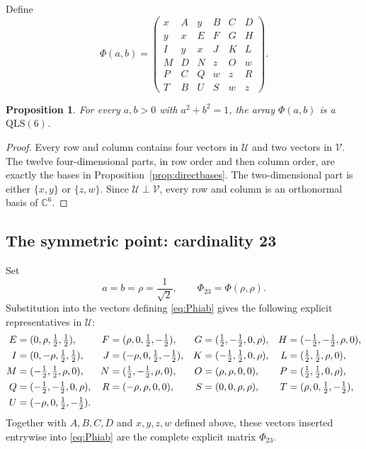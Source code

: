 \documentclass[11pt,a4paper]{article}
\newcommand{\C}{\mathbb{C}}
\newcommand{\QLS}{\mathrm{QLS}}
\newtheorem{proposition}{Proposition}
\begin{document}
Define
\begin{equation}\label{eq:Phiab}
 \Phi(a,b)=
 \begin{pmatrix}
 x&A&y&B&C&D\\
 y&x&E&F&G&H\\
 I&y&x&J&K&L\\
 M&D&N&z&O&w\\
 P&C&Q&w&z&R\\
 T&B&U&S&w&z
 \end{pmatrix}.
\end{equation}

\begin{proposition}\label{prop:PhiabQLS}
For every $a,b>0$ with $a^2+b^2=1$, the array $\Phi(a,b)$ is a $\QLS(6)$.
\end{proposition}

\begin{proof}
Every row and column contains four vectors in $\mathcal U$ and two vectors in
$\mathcal V$.  The twelve four-dimensional parts, in row order and then
column order, are exactly the bases in Proposition~\ref{prop:directbases}.
The two-dimensional part is either $\{x,y\}$ or $\{z,w\}$.  Since
$\mathcal U\perp\mathcal V$, every row and column is an orthonormal basis of
$\C^6$.
\end{proof}

\subsection{The symmetric point: cardinality 23}

Set
\[
 a=b=\rho=\frac1{\sqrt2},
 \qquad
 \Phi_{23}=\Phi(\rho,\rho).
\]
Substitution into the vectors defining \eqref{eq:Phiab} gives the following
explicit representatives in $\mathcal U$:
\begin{align}
E&=(0,\rho,\tfrac12,\tfrac12),&
F&=(\rho,0,\tfrac12,-\tfrac12),&
G&=(\tfrac12,-\tfrac12,0,\rho),&
H&=(-\tfrac12,-\tfrac12,\rho,0),\notag\\
I&=(0,-\rho,\tfrac12,\tfrac12),&
J&=(-\rho,0,\tfrac12,-\tfrac12),&
K&=(-\tfrac12,\tfrac12,0,\rho),&
L&=(\tfrac12,\tfrac12,\rho,0),\notag\\
M&=(-\tfrac12,\tfrac12,\rho,0),&
N&=(\tfrac12,-\tfrac12,\rho,0),&
O&=(\rho,\rho,0,0),&
P&=(\tfrac12,\tfrac12,0,\rho),\notag\\
Q&=(-\tfrac12,-\tfrac12,0,\rho),&
R&=(-\rho,\rho,0,0),&
S&=(0,0,\rho,\rho),&
T&=(\rho,0,\tfrac12,-\tfrac12),\notag\\
U&=(-\rho,0,\tfrac12,-\tfrac12).
\label{eq:explicit23vectors}
\end{align}
Together with $A,B,C,D$ and $x,y,z,w$ defined above, these vectors inserted
entrywise into \eqref{eq:Phiab} are the complete explicit matrix
$\Phi_{23}$.
\end{document}
